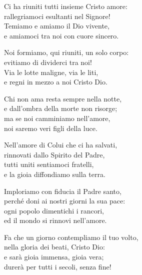 

\spazio

\strofa Ci ha riuniti tutti insieme Cristo amore:\\
rallegriamoci esultanti nel Signore!\\
Temiamo e amiamo il Dio vivente,\\
e amiamoci tra noi con cuore sincero.

\spazio


\spazio

\strofa Noi formiamo, qui riuniti, un solo corpo:\\
evitiamo di dividerci tra noi!\\
Via le lotte maligne, via le liti,\\
e regni in mezzo a noi Cristo Dio.

\spazio


\spazio

\strofa Chi non ama resta sempre nella notte,\\
e dall'ombra della morte non risorge;\\
ma se noi camminiamo nell'amore,\\
noi saremo veri figli della luce.

\spazio


\spazio

\strofa Nell'amore di Colui che ci ha salvati,\\
rinnovati dallo Spirito del Padre,\\
tutti uniti sentiamoci fratelli,\\
e la gioia diffondiamo sulla terra.

\spazio


\spazio

\strofa Imploriamo con fiducia il Padre santo,\\
perché doni ai nostri giorni la sua pace:\\
ogni popolo dimentichi i rancori,\\
ed il mondo si rinnovi nell'amore.

\spazio


\spazio

\strofa Fa che un giorno contempliamo il tuo volto,\\
nella gloria dei beati, Cristo Dio:\\
e sarà gioia immensa, gioia vera;\\
durerà per tutti i secoli, senza fine!

\spazio

